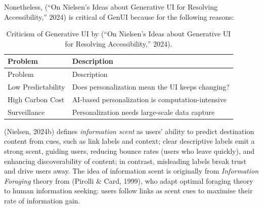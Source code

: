 \documentclass[
  letterpaper,
  DIV=11,
  numbers=noendperiod]{scrartcl}
\begin{document}
Nonetheless, ({``On {Nielsen}'s Ideas about Generative {UI} for
Resolving Accessibility,''} 2024) is critical of GenUI because for the
following reasons:

\begin{longtable}[]{@{}
  >{\raggedright\arraybackslash}p{}
  >{\raggedright\arraybackslash}p{}@{}}
\caption{Criticism of Generative UI by ({``On {Nielsen}'s Ideas about
Generative {UI} for Resolving Accessibility,''} 2024).}\tabularnewline
\toprule\noalign{}
\begin{minipage}[b]{\linewidth}\raggedright
Problem
\end{minipage} & \begin{minipage}[b]{\linewidth}\raggedright
Description
\end{minipage} \\
\midrule\noalign{}
\endfirsthead
\toprule\noalign{}
\begin{minipage}[b]{\linewidth}\raggedright
Problem
\end{minipage} & \begin{minipage}[b]{\linewidth}\raggedright
Description
\end{minipage} \\
\midrule\noalign{}
\endhead
\bottomrule\noalign{}
\endlastfoot
Low Predictability & Does personalization mean the UI keeps changing? \\
High Carbon Cost & AI-based personalization is computation-intensive \\
Surveillance & Personalization needs large-scale data capture \\
\end{longtable}

(Nielsen, 2024b) defines \emph{information scent} as users' ability to
predict destination content from cues, such as link labels and context;
clear descriptive labels emit a strong scent, guiding users, reducing
bounce rates (users who leave quickly), and enhancing discoverability of
content; in contrast, misleading labels break trust and drive users
away. The idea of information scent is originally from \emph{Information
Foraging} theory from (Pirolli \& Card, 1999), who adapt optimal
foraging theory to human information seeking: users follow links as
scent cues to maximise their rate of information gain.
\end{document}
